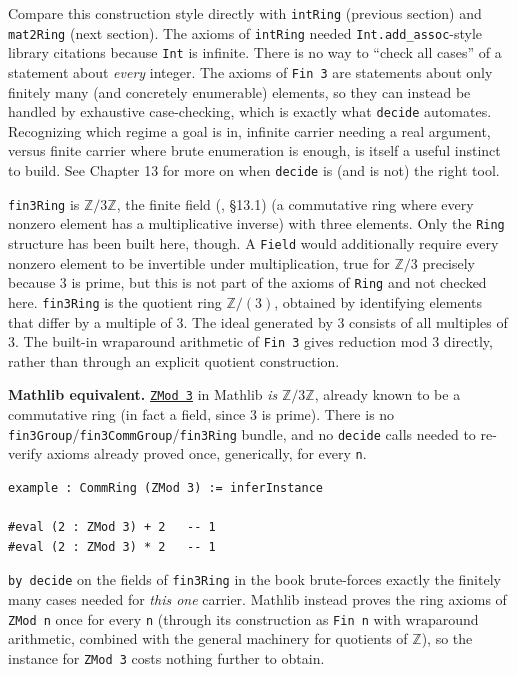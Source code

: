 Compare this construction style directly with \texttt{intRing} (previous section) and \texttt{mat2Ring} (next section). The axioms of \texttt{intRing} needed \texttt{Int.add\_\allowbreak{}assoc}-style library citations because \texttt{Int} is infinite. There is no way to ``check all cases'' of a statement about \emph{every} integer. The axioms of \texttt{Fin 3} are statements about only finitely many (and concretely enumerable) elements, so they can instead be handled by exhaustive case-checking, which is exactly what \texttt{decide} automates. Recognizing which regime a goal is in, infinite carrier needing a real argument, versus finite carrier where brute enumeration is enough, is itself a useful instinct to build. See Chapter 13 for more on when \texttt{decide} is (and is not) the right tool.

\begin{mathreading}

\texttt{fin3Ring} is \(\mathbb{Z}/3\mathbb{Z}\), the finite field (\cite{DummitFoote2003}, §13.1) (a commutative ring where every nonzero element has a multiplicative inverse) with three elements. Only the \texttt{Ring} structure has been built here, though. A \texttt{Field} would additionally require every nonzero element to be invertible under multiplication, true for \(\mathbb{Z}/3\) precisely because \(3\) is prime, but this is not part of the axioms of \texttt{Ring} and not checked here. \texttt{fin3Ring} is the quotient ring \(\mathbb{Z}/(3)\), obtained by identifying elements that differ by a multiple of 3. The ideal generated by 3 consists of all multiples of 3. The built-in wraparound arithmetic of \texttt{Fin 3} gives reduction mod \(3\) directly, rather than through an explicit quotient construction.

\end{mathreading}

\textbf{Mathlib equivalent.} \href{https://loogle.lean-lang.org/?q=ZMod}{\texttt{ZMod 3}} in Mathlib \emph{is} \(\mathbb{Z}/3\mathbb{Z}\), already known to be a commutative ring (in fact a field, since \(3\) is prime). There is no \texttt{fin3Group}/\texttt{fin3CommGroup}/\texttt{fin3Ring} bundle, and no \texttt{decide} calls needed to re-verify axioms already proved once, generically, for every \texttt{n}.

\begin{lstlisting}
example : CommRing (ZMod 3) := inferInstance

#eval (2 : ZMod 3) + 2   -- 1
#eval (2 : ZMod 3) * 2   -- 1
\end{lstlisting}

\texttt{by decide} on the fields of \texttt{fin3Ring} in the book brute-forces exactly the finitely many cases needed for \emph{this one} carrier. Mathlib instead proves the ring axioms of \texttt{ZMod n} once for every \texttt{n} (through its construction as \texttt{Fin n} with wraparound arithmetic, combined with the general machinery for quotients of \(\mathbb{Z}\)), so the instance for \texttt{ZMod 3} costs nothing further to obtain.


